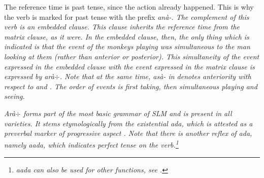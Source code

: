 
The reference time is past tense, since the action already happened. This is why the verb  is marked for past tense with the prefix \em anà-\em. The complement of this verb is an embedded clause. This clause inherits the  reference time from the matrix clause, as it were. In the embedded clause, then, the only thing which is indicated is that the event of the monkeys playing was simultaneous to the man looking at them (rather than anterior or posterior). This simultaneity of the event expressed in the embedded clause with the event expressed in the matrix clause is expressed by \em arà$\div$\em. Note that at the same time, \em asà- \em in  denotes anteriority with respect to  and . The order of events is first taking, then simultaneous playing and seeing.

\em Arà$\div$ \em forms part of the most basic grammar of SLM and is present in all varieties. It stems etymologically from the existential \em*ada\em, which is attested as a preverbal marker of progressive aspect \citep[14]{Adelaar2005struct}. Note that there is another reflex of \em *ada\em, namely \em aada\em, which indicates perfect tense on the verb.\footnote{\em aada \em can also be used for other functions, see .}

% 
% 
% 




